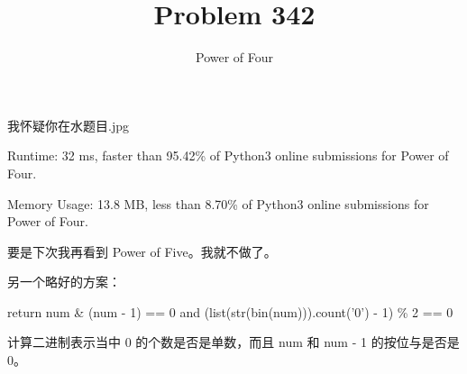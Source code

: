\documentclass[UTF8]{ctexart}
\title{Problem 342}
\author{Power of Four}
\begin{document}
我怀疑你在水题目.jpg

Runtime: 32 ms, faster than 95.42\% of Python3 online submissions for Power of Four.

Memory Usage: 13.8 MB, less than 8.70\% of Python3 online submissions for Power of Four.

要是下次我再看到 Power of Five。我就不做了。

另一个略好的方案：

      return num & (num - 1) == 0 and (list(str(bin(num))).count('0') - 1) \% 2 == 0
      
计算二进制表示当中 0 的个数是否是单数，而且 num 和 num - 1 的按位与是否是 0。
\end{document}
